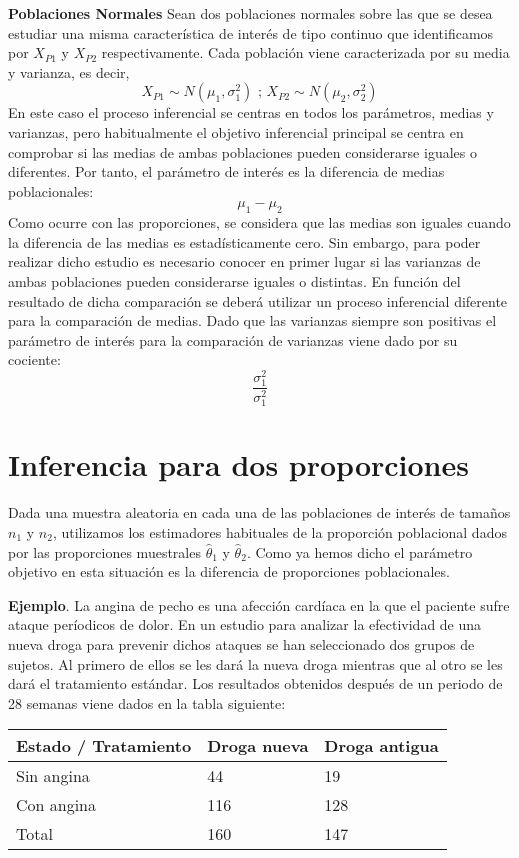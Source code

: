 \documentclass[
]{book}
\begin{document}
\textbf{Poblaciones Normales} Sean dos poblaciones normales sobre las que se desea estudiar una misma característica de interés de tipo continuo que identificamos por \(X_{P1}\) y \(X_{P2}\) respectivamente. Cada población viene caracterizada por su media y varianza, es decir, \[X_{P1} \sim N(\mu_1,\sigma^2_1) \text{    ;  }  X_{P2} \sim N(\mu_2,\sigma^2_2)\] En este caso el proceso inferencial se centras en todos los parámetros, medias y varianzas, pero habitualmente el objetivo inferencial principal se centra en comprobar si las medias de ambas poblaciones pueden considerarse iguales o diferentes. Por tanto, el parámetro de interés es la diferencia de medias poblacionales: \[\mu_1 - \mu_2\] Como ocurre con las proporciones, se considera que las medias son iguales cuando la diferencia de las medias es estadísticamente cero. Sin embargo, para poder realizar dicho estudio es necesario conocer en primer lugar si las varianzas de ambas poblaciones pueden considerarse iguales o distintas. En función del resultado de dicha comparación se deberá utilizar un proceso inferencial diferente para la comparación de medias. Dado que las varianzas siempre son positivas el parámetro de interés para la comparación de varianzas viene dado por su cociente: \[\frac{\sigma^2_1}{\sigma^2_1}\]

\hypertarget{inferencia-para-dos-proporciones}{%
\section{Inferencia para dos proporciones}\label{inferencia-para-dos-proporciones}}

Dada una muestra aleatoria en cada una de las poblaciones de interés de tamaños \(n_1\) y \(n_2\), utilizamos los estimadores habituales de la proporción poblacional dados por las proporciones muestrales \(\hat{\theta}_1\) y \(\hat{\theta}_2\). Como ya hemos dicho el parámetro objetivo en esta situación es la diferencia de proporciones poblacionales.

\textbf{Ejemplo}. La angina de pecho es una afección cardíaca en la que el paciente sufre ataque períodicos de dolor. En un estudio para analizar la efectividad de una nueva droga para prevenir dichos ataques se han seleccionado dos grupos de sujetos. Al primero de ellos se les dará la nueva droga mientras que al otro se les dará el tratamiento estándar. Los resultados obtenidos después de un periodo de 28 semanas viene dados en la tabla siguiente:

\begin{longtable}[]{@{}lll@{}}
\toprule()
Estado / Tratamiento & Droga nueva & Droga antigua \\
\midrule()
\endhead
Sin angina & 44 & 19 \\
Con angina & 116 & 128 \\
Total & 160 & 147 \\
\bottomrule()
\end{longtable}
\end{document}

